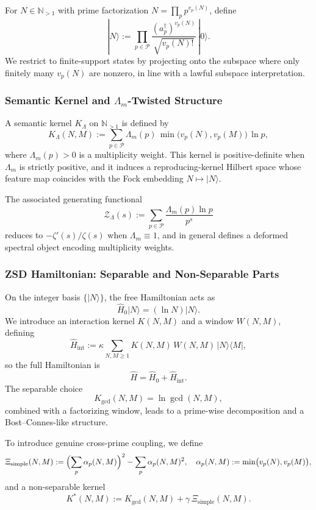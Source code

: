 \documentclass[11pt]{article}
\begin{document}
For $N \in \mathbb{N}_{>1}$ with prime factorization
$N = \prod_p p^{v_p(N)}$, define
\[
  |N\rangle :=
  \prod_{p\in\mathcal{P}}
  \frac{(a_p^\dagger)^{v_p(N)}}{\sqrt{v_p(N)!}}\,|0\rangle.
\]
We restrict to finite-support states by projecting onto the subspace
where only finitely many $v_p(N)$ are nonzero, in line with a lawful
subspace interpretation.

\subsubsection{Semantic Kernel and $\Lambda_m$-Twisted Structure}

A semantic kernel $K_\Lambda$ on $\mathbb{N}_{>1}$ is defined by
\[
  K_\Lambda(N,M)
    := \sum_{p\in\mathcal{P}}
       \Lambda_m(p)\,\min\bigl(v_p(N),v_p(M)\bigr)\,\ln p,
\]
where $\Lambda_m(p) > 0$ is a multiplicity weight. This kernel is
positive-definite when $\Lambda_m$ is strictly positive, and it induces
a reproducing-kernel Hilbert space whose feature map coincides with the
Fock embedding $N \mapsto |N\rangle$.

The associated generating functional
\[
  \mathcal{Z}_\Lambda(s) :=
  \sum_{p\in\mathcal{P}} \frac{\Lambda_m(p)\ln p}{p^s}
\]
reduces to $-\zeta'(s)/\zeta(s)$ when $\Lambda_m \equiv 1$, and in
general defines a deformed spectral object encoding multiplicity
weights.

\subsubsection{ZSD Hamiltonian: Separable and Non-Separable Parts}

On the integer basis $\{|N\rangle\}$, the free Hamiltonian acts as
\[
  \hat{H}_0 |N\rangle = (\ln N) |N\rangle.
\]
We introduce an interaction kernel $K(N,M)$ and a window $W(N,M)$,
defining
\[
  \hat{H}_{\text{int}} :=
  \kappa \sum_{N,M\ge 1} K(N,M)\,W(N,M)\,|N\rangle\langle M|,
\]
so the full Hamiltonian is
\[
  \hat{H} = \hat{H}_0 + \hat{H}_{\text{int}}.
\]
The separable choice
\[
  K_{\gcd}(N,M) = \ln\gcd(N,M),
\]
combined with a factorizing window, leads to a prime-wise decomposition
and a Bost--Connes-like structure.

To introduce genuine cross-prime coupling, we define
\[
  \Xi_{\text{simple}}(N,M)
    := \Bigl( \sum_p \alpha_p(N,M) \Bigr)^2
       - \sum_p \alpha_p(N,M)^2,
  \quad
  \alpha_p(N,M) := \min\bigl(v_p(N),v_p(M)\bigr),
\]
and a non-separable kernel
\[
  K^*(N,M)
    := K_{\gcd}(N,M) + \gamma\,\Xi_{\text{simple}}(N,M).
\]
\end{document}
